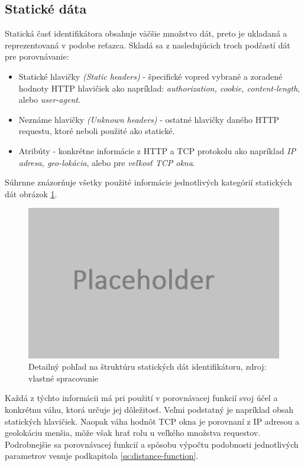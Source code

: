 \documentclass[
  digital, %
  table,   %
  lof,     %
  nolot,   %
  nocover
]{fithesis3}
\begin{document}
\subsection{Statické dáta}
Statická časť identifikátora obsahuje väčšie množstvo dát, preto je
ukladaná a reprezentovaná v podobe reťazca. Skladá sa z nasledujúcich troch podčastí dát pre porovnávanie:
\begin{itemize}
    \item Statické hlavičky \textit{(Static headers)} - špecifické vopred
    vybrané a zoradené hodnoty HTTP hlavičiek ako napríklad: \textit{authorization, cookie, content-length}, alebo
    \textit{user-agent}.
    \item Neznáme hlavičky \textit{(Unknown headers)} - ostatné hlavičky daného
    HTTP requestu, ktoré neboli použité ako statické.
    \item Atribúty - konkrétne informácie z HTTP a TCP protokolu ako napríklad
    \textit{IP adresa, geo-lokácia}, alebo pre \textit{veľkosť TCP okna}.
\end{itemize}

Súhrnne znázorňuje všetky použité informácie jednotlivých kategórií statických dát obrázok
\ref{fig:footprint-data-static}.

\begin{figure}[h]
  \centering
    \includegraphics[width=.99\textwidth]{images/footprint-data-static.png}
  \caption{Detailný pohľad na štruktúru statických dát identifikátoru, zdroj:
  vlastné spracovanie}
  \label{fig:footprint-data-static}
\end{figure}

Každá z týchto informácii má pri použití v porovnávacej funkcií svoj účel a
konkrétnu váhu, ktorá určuje jej dôležitosť. Veľmi podstatný je napríklad obsah statických hlavičiek. Naopak
váha hodnôt TCP okna je porovnaní z IP adresou a geolokáciu menšia, môže však
hrať rolu u veľkého množstva requestov. Podrobnejšie sa porovnávacej funkcií a
spôsobu výpočtu podobnosti jednotlivých parametrov venuje podkapitola \ref{ss:distance-function}.
\end{document}

